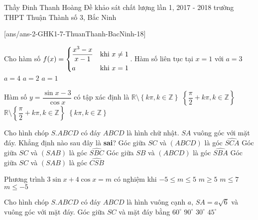 
\begin{name}
{Thầy Đinh Thanh Hoàng}
{Đề khảo sát chất lượng lần 1, 2017 - 2018 trường THPT Thuận Thành số 3, Bắc Ninh}
\end{name}
\setcounter{ex}{0}
[ans/ans-2-GHK1-7-ThuanThanh-BacNinh-18]
\begin{ex}%
Cho hàm số $f(x)=\left\{\begin{aligned}&\dfrac{x^3-x}{x-1}& \text{khi } x \neq 1\\ &a &\text{khi }x=1\end{aligned}\right.$. Hàm số liên tục tại $x=1$ với
\choice
{$a=3$}
{$a=4$}
{\True $a=2$}
{$a=1$}
\end{ex}

\begin{ex}%
Hàm số $y=\dfrac{\sin x - 3}{\cos x}$ có tập xác định là
\choice
{$\mathbb{R}\setminus \left\lbrace k\pi, k \in \mathbb{Z}\right\rbrace$}
{$\left\lbrace \dfrac{\pi}{2} + k\pi, k \in \mathbb{Z}\right\rbrace$}
{\True $\mathbb{R}\setminus \left\lbrace \dfrac{\pi}{2} + k\pi, k \in \mathbb{Z}\right\rbrace$}
{$\left\lbrace k\pi, k \in \mathbb{Z}\right\rbrace$}
\end{ex}

\begin{ex}%
Cho hình chóp $S.ABCD$ có đáy $ABCD$ là hình chữ nhật. $SA$ vuông góc với mặt đáy. Khẳng định nào sau đây là \textbf{sai}?
\choice
{Góc giữa $SC$ và $(ABCD)$ là góc $\widehat{SCA}$}
{\True Góc giữa $SC$ và $(SAB)$ là góc $\widehat{SBC}$}
{Góc giữa $SB$ và $(ABCD)$ là góc $\widehat{SBA}$}
{Góc giữa $SC$ và $(SAB)$ là góc $\widehat{CSB}$}
\end{ex}

\begin{ex}%
Phương trình $3\sin x + 4\cos x = m$ có nghiệm khi
\choice
{\True $-5 \leq m \leq 5$}
{$m \geq 5$}
{$m \leq 7$}
{$m \leq -5$}
\end{ex}

\begin{ex}%
Cho hình chóp $S.ABCD$ có đáy $ABCD$ là hình vuông cạnh $a$, $SA=a\sqrt{6}$ và vuông góc với mặt đáy. Góc giữa $SC$ và mặt đáy bằng
\choice
{\True $60^\circ$}
{$90^\circ$}
{$30^\circ$}
{$45^\circ$}
\end{ex}

